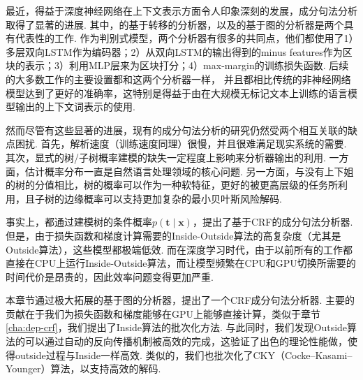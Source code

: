 最近，得益于深度神经网络在上下文表示方面令人印象深刻的发展，成分句法分析取得了显著的进展.
其中，\cite{cross-huang-2016-span}的基于转移的分析器，以及\cite{stern-etal-2017-minimal}的基于图的分析器是两个具有代表性的工作.
作为判别式模型，两个分析器有很多的共同点，他们都使用了1）多层双向LSTM作为编码器；2）从双向LSTM的输出得到的minus features作为区块的表示；3）利用MLP层来为区块打分；4）max-margin的训练损失函数.
后续的大多数工作\cite{gaddy-etal-2018-whats,kitaev-klein-2018-constituency}的主要设置都和这两个分析器一样， 并且都相比传统的非神经网络模型达到了更好的准确率，这特别是得益于由在大规模无标记文本上训练的语言模型输出的上下文词表示的使用\cite{peters-etal-2018-deep,devlin-etal-2019-bert}.

然而尽管有这些显著的进展，现有的成分句法分析的研究仍然受两个相互关联的缺点困扰.
首先，解析速度（训练速度同理）很慢，并且很难满足现实系统的需要.
其次，显式的树/子树概率建模的缺失一定程度上影响来分析器输出的利用.
一方面，估计概率分布一直是自然语言处理领域的核心问题\cite{le-zuidema-2014-inside}.
另一方面，与没有上下姐的树的分值相比，树的概率可以作为一种软特征，更好的被更高层级的任务所利用\cite{jin-etal-2020-relation}，且子树的边缘概率可以支持更加复杂的最小贝叶斯风险解码\cite{smith-smith-2007-probabilistic}.

事实上，\cite{finkel-etal-2008-efficient,durrett-klein-2015-neural}都通过建模树的条件概率$p(\boldsymbol{t}\mid\boldsymbol{x})$，提出了基于CRF\cite{lafferty-etal-2001-crf}的成分句法分析器.
但是，由于损失函数和梯度计算需要的Inside-Outside算法的高复杂度（尤其是Outside算法），这些模型都极端低效.
而在深度学习时代，由于以前所有的工作都直接在CPU上运行Inside-Outside算法，而让模型频繁在CPU和GPU切换所需要的时间代价是昂贵的，因此效率问题变得更加严重.

本章节通过极大拓展\cite{stern-etal-2017-minimal}的基于图的分析器，提出了一个CRF成分句法分析器.
主要的贡献在于我们为损失函数和梯度能够在GPU上能够直接计算，类似于章节\ref{cha:dep-crf}，我们提出了Inside算法的批次化方法.
与此同时，我们发现Outside算法的可以通过自动的反向传播机制被高效的完成，这验证了\cite{eisner-2016-inside}出色的理论性能做，使得outside过程与Inside一样高效.
类似的，我们也批次化了CKY（Cocke–Kasami–Younger）算法，以支持高效的解码.

